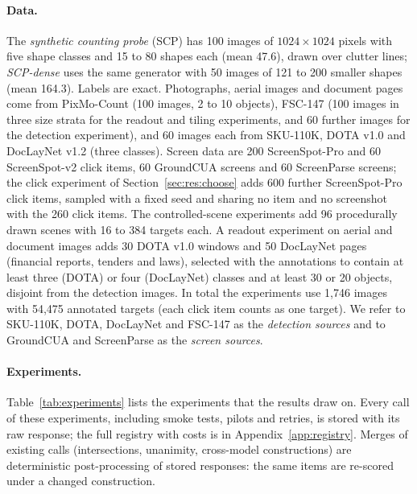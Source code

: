 \paragraph{Data.} The \emph{synthetic counting probe} (SCP) has 100 images of $1024\times1024$ pixels with five shape classes and 15 to 80 shapes each (mean 47.6), drawn over clutter lines; \emph{SCP-dense} uses the same generator with 50 images of 121 to 200 smaller shapes (mean 164.3). Labels are exact. Photographs, aerial images and document pages come from PixMo-Count (100 images, 2 to 10 objects), FSC-147 (100 images in three size strata for the readout and tiling experiments, and 60 further images for the detection experiment), and 60 images each from SKU-110K, DOTA v1.0 and DocLayNet v1.2 (three classes). Screen data are 200 ScreenSpot-Pro and 60 ScreenSpot-v2 click items, 60 GroundCUA screens and 60 ScreenParse screens; the click experiment of Section~\ref{sec:res:choose} adds 600 further ScreenSpot-Pro click items, sampled with a fixed seed and sharing no item and no screenshot with the 260 click items. The controlled-scene experiments add 96 procedurally drawn scenes with 16 to 384 targets each. A readout experiment on aerial and document images adds 30 DOTA v1.0 windows and 50 DocLayNet pages (financial reports, tenders and laws), selected with the annotations to contain at least three (DOTA) or four (DocLayNet) classes and at least 30 or 20 objects, disjoint from the detection images. In total the experiments use 1,746 images with 54,475 annotated targets (each click item counts as one target). We refer to SKU-110K, DOTA, DocLayNet and FSC-147 as the \emph{detection sources} and to GroundCUA and ScreenParse as the \emph{screen sources}.

\paragraph{Experiments.} Table~\ref{tab:experiments} lists the experiments that the results draw on. Every call of these experiments, including smoke tests, pilots and retries, is stored with its raw response; the full registry with costs is in Appendix~\ref{app:registry}. Merges of existing calls (intersections, unanimity, cross-model constructions) are deterministic post-processing of stored responses: the same items are re-scored under a changed construction.

